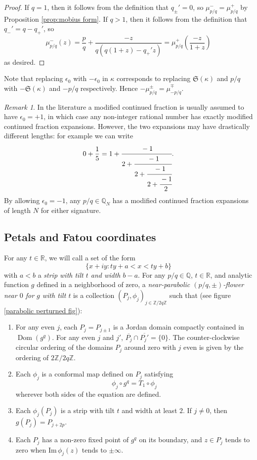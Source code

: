 \documentclass[12pt,letterpaper]{amsart}
\numberwithin{equation}{section}
\theoremstyle{remark}
\newtheorem{remark}[equation]{Remark}
\theoremstyle{definition}
\newcommand{\Q}{\mathbb Q}
\newcommand{\R}{\mathbb R}
\newcommand{\Z}{\mathbb Z}
\DeclareMathOperator{\Dom}{Dom}
\newcommand{\aktodo}[2][inline]{\todo[color=red!40,#1]{#2}}
\begin{document}
	\begin{proof}
		If $q = 1$, then it follows from the definition that $q_\pm' = 0$, so $\mu_{p/q}^-= \mu_{p/q}^+$ by Proposition \ref{prop:mobius form}.
		If $q> 1$, then it follows from the definition that $q_{-}' = q-q_+'$, so 
		$$\mu_{p/q}^-(z) = \frac{p}{q}+ \frac{-z}{q(q(1+z)-q_+'z)}= \mu_{p/q}^+\left(\frac{-z}{1+z}\right)$$
		as desired.
	\end{proof}
	
	Note that replacing $\epsilon_0$ with $-\epsilon_0$ in $\kappa$ corresponds to replacing $\mathfrak{S}(\kappa)$ and $p/q$ with $-\mathfrak{S}(\kappa)$ and $-p/q$ respectively. Hence $-\mu_{p/q}^\pm = \mu_{-p/q}^\mp$.
	
	\begin{remark}
		In the literature a modified continued fraction  is usually assumed to have $\epsilon_0= +1$, in which case any non-integer rational number has exactly modified continued fraction expansions. However, the two expansions may have drastically different lengths: for example we can write 
		$$0+\frac{1}{5}= 1+ \cfrac{-1}{2+\cfrac{-1}{2+\cfrac{-1}{2+\cfrac{-1}{2}}}}.$$
		By allowing $\epsilon_0=-1$, any $p/q\in \Q_N$ has a modified continued fraction expansions of length $N$ for either signature.
	\end{remark}
	
	
	\subsection{Petals and Fatou coordinates}
	

For any $t\in \R$, 
we will call a set of the form 
$$\{x+iy:ty+a< x< ty+b\}$$
with $a < b$ a \textit{strip with tilt $t$ and width $b-a$}.
For any $p/q\in \Q$, $t\in \R$, and analytic function $g$ defined in a neighborhood of zero, a \textit{near-parabolic $(p/q, \pm)$-flower near $0$ for $g$ with tilt $t$} is a collection $(P_j, \phi_j)_{j\in \Z/2q\Z}$ such that (see figure \ref{parabolic perturned fig}):


\begin{enumerate}
	\item 
	For any even $j$, each $P_j = P_{j\pm 1}$ is a Jordan domain compactly contained in $\Dom(g^q)$. For any even $j$ and $j'$,   $\overline{P_j}\cap \overline{P_j'}= \{0\}$. The counter-clockwise circular ordering of the domains $P_j$  around zero with $j$ even is given by the ordering of $2\Z/2q\Z$.
	\item Each $\phi_j$ is a conformal map defined on $P_j$ satisfying
	$$\phi_j\circ g^q= T_1\circ \phi_j$$
	wherever both sides of the equation are defined. 
	\item Each $\phi_j(P_j)$ is a strip with tilt $t$ and width at least $2$. 
	If $j\neq 0$, then $g(P_j) = P_{j+2p}.$
	\item Each $P_j$ has a non-zero fixed point of $g^q$ on its boundary, and $z\in P_j$ tends to zero when $\text{Im}\,\phi_j(z)$ tends to $\pm\infty$.
\end{enumerate}
\end{document}
